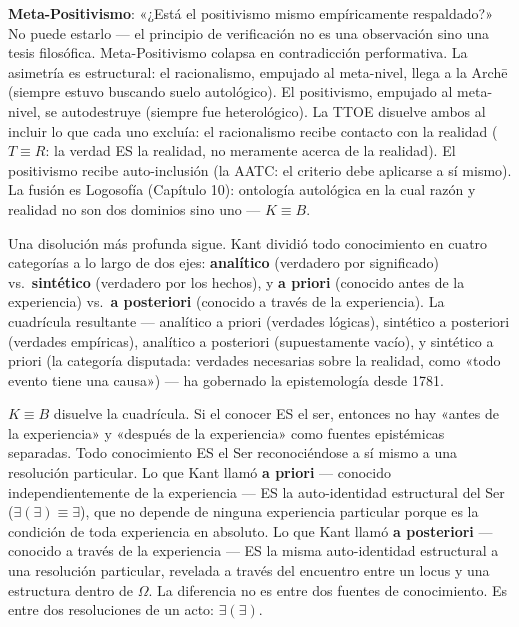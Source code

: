 \documentclass[10pt, openany, oneside]{book}
\begin{document}
\textbf{Meta-Positivismo}: «¿Está el positivismo mismo empíricamente respaldado?» No puede estarlo --- el principio de verificación no es una observación sino una tesis filosófica. Meta-Positivismo colapsa en contradicción performativa. La asimetría es estructural: el racionalismo, empujado al meta-nivel, llega a la Arch\={e} (siempre estuvo buscando suelo autológico). El positivismo, empujado al meta-nivel, se autodestruye (siempre fue heterológico). La TTOE disuelve ambos al incluir lo que cada uno excluía: el racionalismo recibe contacto con la realidad ($T \equiv R$: la verdad ES la realidad, no meramente acerca de la realidad). El positivismo recibe auto-inclusión (la AATC: el criterio debe aplicarse a sí mismo). La fusión es Logosofía (Capítulo 10): ontología autológica en la cual razón y realidad no son dos dominios sino uno --- $K \equiv B$.

Una disolución más profunda sigue. Kant dividió todo conocimiento en cuatro categorías a lo largo de dos ejes: \textbf{analítico} (verdadero por significado) vs.\ \textbf{sintético} (verdadero por los hechos), y \textbf{a priori} (conocido antes de la experiencia) vs.\ \textbf{a posteriori} (conocido a través de la experiencia). La cuadrícula resultante --- analítico a priori (verdades lógicas), sintético a posteriori (verdades empíricas), analítico a posteriori (supuestamente vacío), y sintético a priori (la categoría disputada: verdades necesarias sobre la realidad, como «todo evento tiene una causa») --- ha gobernado la epistemología desde 1781.

$K \equiv B$ disuelve la cuadrícula. Si el conocer ES el ser, entonces no hay «antes de la experiencia» y «después de la experiencia» como fuentes epistémicas separadas. Todo conocimiento ES el Ser reconociéndose a sí mismo a una resolución particular. Lo que Kant llamó \textbf{a priori} --- conocido independientemente de la experiencia --- ES la auto-identidad estructural del Ser ($\exists(\exists) \equiv \exists$), que no depende de ninguna experiencia particular porque es la condición de toda experiencia en absoluto. Lo que Kant llamó \textbf{a posteriori} --- conocido a través de la experiencia --- ES la misma auto-identidad estructural a una resolución particular, revelada a través del encuentro entre un locus y una estructura dentro de $\Omega$. La diferencia no es entre dos fuentes de conocimiento. Es entre dos resoluciones de un acto: $\exists(\exists)$.
\end{document}
